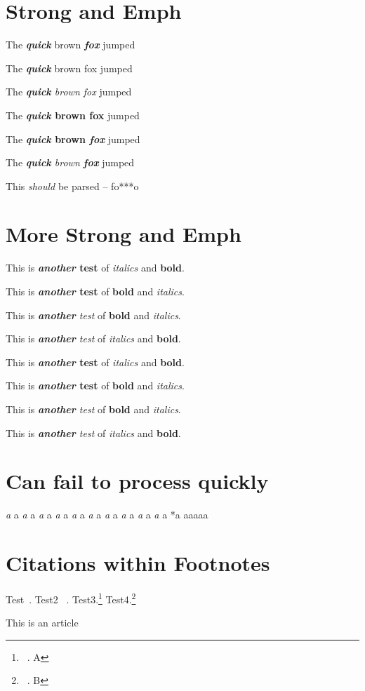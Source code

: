 
\def\mytitle{Edge Cases}


\part{Strong and Emph}
\label{strongandemph}

The \textbf{\emph{quick}} brown \textbf{\emph{fox}} jumped

The \textbf{\emph{quick}} brown fox jumped

The \emph{\textbf{quick} brown fox} jumped

The \textbf{\emph{quick} brown fox} jumped

The \textbf{\emph{quick} brown \emph{fox}} jumped

The \emph{\textbf{quick} brown \textbf{fox}} jumped

This \emph{should} be parsed -- fo***o

\part{More Strong and Emph}
\label{morestrongandemph}

This is \textbf{\emph{another} test} of \emph{italics} and \textbf{bold}.

This is \textbf{\emph{another} test} of \textbf{bold} and \emph{italics}.

This is \emph{\textbf{another} test} of \textbf{bold} and \emph{italics}.

This is \emph{\textbf{another} test} of \emph{italics} and \textbf{bold}.

This is \textbf{\emph{another} test} of \emph{italics} and \textbf{bold}.

This is \textbf{\emph{another} test} of \textbf{bold} and \emph{italics}.

This is \emph{\textbf{another} test} of \textbf{bold} and \emph{italics}.

This is \emph{\textbf{another} test} of \emph{italics} and \textbf{bold}.

\part{Can fail to process quickly}
\label{canfailtoprocessquickly}

\emph{a
}a
\emph{a
}a
\emph{a
}a
\emph{a
}a
\emph{a
}a
\emph{a
}a
\emph{a
}a
\emph{a
}a
\emph{a
}a
\emph{a
}a
*a
aaaaa

\part{Citations within Footnotes}
\label{citationswithinfootnotes}

Test~\citep{Citekey;}. Test2 ~\citep{Citekey;}. Test3.\footnote{~\citep{Citekey;}. A} Test4.\footnote{~\citep{Citekey;}. B}

\begin{thebibliography}{0}

This is an article




\end{thebibliography}




